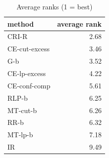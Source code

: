 \begin{table}[htbp]
\centering
\small
\caption{Average ranks (1 = best)}
\label{tab:E2b_head_to_head_budgets_b10_ranks}
\begin{tabular}{lr}
\toprule
method & average rank \\
\midrule
CRI-R & 2.68 \\
CE-cut-excess & 3.46 \\
G-b & 3.52 \\
CE-lp-excess & 4.22 \\
CE-conf-comp & 5.61 \\
RLP-b & 6.25 \\
MT-cut-b & 6.26 \\
RR-b & 6.32 \\
MT-lp-b & 7.18 \\
IR & 9.49 \\
\bottomrule
\end{tabular}
\end{table}
